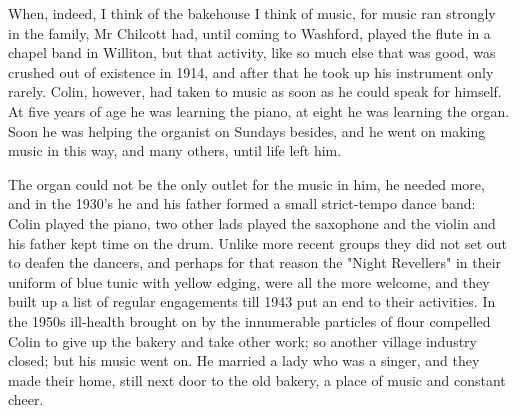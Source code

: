 When, indeed, I think of the bakehouse I think of music, for music ran strongly in the family, Mr Chilcott had, until coming to Washford, played the flute in a chapel band in Williton, but that activity, like so much else that was good, was crushed out of existence in 1914, and after that he took up his instrument only rarely. Colin, however, had taken to music as soon as he could speak for himself. At five years of age he was learning the piano, at eight he was learning the organ. Soon he was helping the organist on Sundays besides, and he went on making music in this way, and many others, until life left him.

The organ could not be the only outlet for the music in him, he needed more, and in the 1930’s he and his father formed a small strict-tempo dance band: Colin played the piano, two other lads played the saxophone and the violin and his father kept time on the drum. Unlike more recent groups they did not set out to deafen the dancers, and perhaps for that reason the "Night Revellers" in their uniform of blue tunic with yellow edging, were all the more welcome, and they built up a list of regular engagements till 1943 put an end to their activities. In the 1950s ill-health brought on by the innumerable particles of flour compelled Colin to give up the bakery and take other work; so another village industry closed; but his music went on. He married a lady who was a singer, and they made their home, still next door to the old bakery, a place of music and constant cheer.
